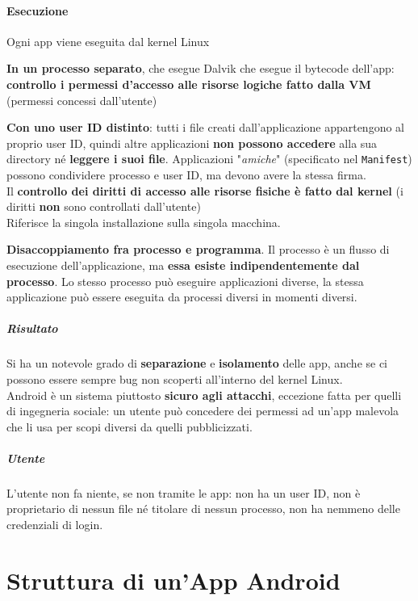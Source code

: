 \documentclass[10pt]{book}
\begin{document}
\subsubsection{Esecuzione}
Ogni app viene eseguita dal kernel Linux
\begin{list}{}{}
	\item \textbf{In un processo separato}, che esegue Dalvik che esegue il bytecode dell'app: \textbf{controllo i permessi d'accesso alle risorse logiche fatto dalla VM} (permessi concessi dall'utente)
	\item \textbf{Con uno user ID distinto}: tutti i file creati dall'applicazione appartengono al proprio user ID, quindi altre applicazioni \textbf{non possono accedere} alla sua directory né \textbf{leggere i suoi file}. Applicazioni "\textit{amiche}" (specificato nel \texttt{Manifest}) possono condividere processo e user ID, ma devono avere la stessa firma.\\
	Il \textbf{controllo dei diritti di accesso alle risorse fisiche è fatto dal kernel} (i diritti \textbf{non} sono controllati dall'utente)\\
	Riferisce la singola installazione sulla singola macchina.
\end{list}
\textbf{Disaccoppiamento fra processo e programma}. Il processo è un flusso di esecuzione dell'applicazione, ma \textbf{essa esiste indipendentemente dal processo}. Lo stesso processo può eseguire applicazioni diverse, la stessa applicazione può essere eseguita da processi diversi in momenti diversi.
\paragraph{Risultato} Si ha un notevole grado di \textbf{separazione} e \textbf{isolamento} delle app, anche se ci possono essere sempre bug non scoperti all'interno del kernel Linux.\\
Android è un sistema piuttosto \textbf{sicuro agli attacchi}, eccezione fatta per quelli di ingegneria sociale: un utente può concedere dei permessi ad un'app malevola che li usa per scopi diversi da quelli pubblicizzati.
\paragraph{Utente} L'utente non fa niente, se non tramite le app: non ha un user ID, non è proprietario di nessun file né titolare di nessun processo, non ha nemmeno delle credenziali di login.
\chapter{Struttura di un'App Android}
\end{document}

